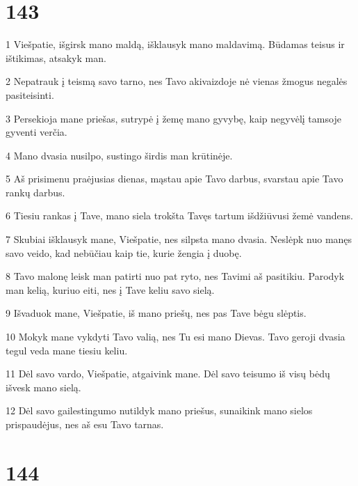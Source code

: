 \chapter{143}


\par 1 Viešpatie, išgirsk mano maldą, išklausyk mano maldavimą. Būdamas teisus ir ištikimas, atsakyk man. 
\par 2 Nepatrauk į teismą savo tarno, nes Tavo akivaizdoje nė vienas žmogus negalės pasiteisinti. 
\par 3 Persekioja mane priešas, sutrypė į žemę mano gyvybę, kaip negyvėlį tamsoje gyventi verčia. 
\par 4 Mano dvasia nusilpo, sustingo širdis man krūtinėje. 
\par 5 Aš prisimenu praėjusias dienas, mąstau apie Tavo darbus, svarstau apie Tavo rankų darbus. 
\par 6 Tiesiu rankas į Tave, mano siela trokšta Tavęs tartum išdžiūvusi žemė vandens. 
\par 7 Skubiai išklausyk mane, Viešpatie, nes silpsta mano dvasia. Neslėpk nuo manęs savo veido, kad nebūčiau kaip tie, kurie žengia į duobę. 
\par 8 Tavo malonę leisk man patirti nuo pat ryto, nes Tavimi aš pasitikiu. Parodyk man kelią, kuriuo eiti, nes į Tave keliu savo sielą. 
\par 9 Išvaduok mane, Viešpatie, iš mano priešų, nes pas Tave bėgu slėptis. 
\par 10 Mokyk mane vykdyti Tavo valią, nes Tu esi mano Dievas. Tavo geroji dvasia tegul veda mane tiesiu keliu. 
\par 11 Dėl savo vardo, Viešpatie, atgaivink mane. Dėl savo teisumo iš visų bėdų išvesk mano sielą. 
\par 12 Dėl savo gailestingumo nutildyk mano priešus, sunaikink mano sielos prispaudėjus, nes aš esu Tavo tarnas.


\chapter{144}


